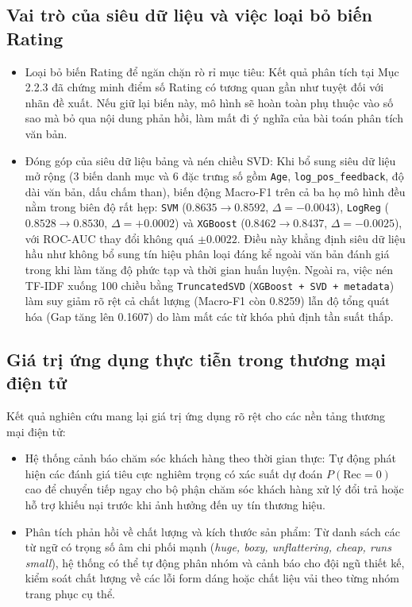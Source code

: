 \subsection{Vai trò của siêu dữ liệu và việc loại bỏ biến Rating}
\begin{itemize}
    \item Loại bỏ biến Rating để ngăn chặn rò rỉ mục tiêu: Kết quả phân tích tại Mục 2.2.3 đã chứng minh điểm số Rating có tương quan gần như tuyệt đối với nhãn đề xuất. Nếu giữ lại biến này, mô hình sẽ hoàn toàn phụ thuộc vào số sao mà bỏ qua nội dung phản hồi, làm mất đi ý nghĩa của bài toán phân tích văn bản.
    \item Đóng góp của siêu dữ liệu bảng và nén chiều SVD: Khi bổ sung siêu dữ liệu mở rộng (3 biến danh mục và 6 đặc trưng số gồm \texttt{Age}, \texttt{log\_pos\_feedback}, độ dài văn bản, dấu chấm than), biến động Macro-F1 trên cả ba họ mô hình đều nằm trong biên độ rất hẹp: \texttt{SVM} ($0.8635 \to 0.8592$, $\Delta = -0.0043$), \texttt{LogReg} ($0.8528 \to 0.8530$, $\Delta = +0.0002$) và \texttt{XGBoost} ($0.8462 \to 0.8437$, $\Delta = -0.0025$), với ROC-AUC thay đổi không quá $\pm 0.0022$. Điều này khẳng định siêu dữ liệu hầu như không bổ sung tín hiệu phân loại đáng kể ngoài văn bản đánh giá trong khi làm tăng độ phức tạp và thời gian huấn luyện. Ngoài ra, việc nén TF-IDF xuống 100 chiều bằng \texttt{TruncatedSVD} (\texttt{XGBoost + SVD + metadata}) làm suy giảm rõ rệt cả chất lượng (Macro-F1 còn 0.8259) lẫn độ tổng quát hóa (Gap tăng lên 0.1607) do làm mất các từ khóa phủ định tần suất thấp.
\end{itemize}

\subsection{Giá trị ứng dụng thực tiễn trong thương mại điện tử}
Kết quả nghiên cứu mang lại giá trị ứng dụng rõ rệt cho các nền tảng thương mại điện tử:
\begin{itemize}
    \item Hệ thống cảnh báo chăm sóc khách hàng theo thời gian thực: Tự động phát hiện các đánh giá tiêu cực nghiêm trọng có xác suất dự đoán $P(\text{Rec}=0)$ cao để chuyển tiếp ngay cho bộ phận chăm sóc khách hàng xử lý đổi trả hoặc hỗ trợ khiếu nại trước khi ảnh hưởng đến uy tín thương hiệu.
    \item Phân tích phản hồi về chất lượng và kích thước sản phẩm: Từ danh sách các từ ngữ có trọng số âm chi phối mạnh (\textit{huge, boxy, unflattering, cheap, runs small}), hệ thống có thể tự động phân nhóm và cảnh báo cho đội ngũ thiết kế, kiểm soát chất lượng về các lỗi form dáng hoặc chất liệu vải theo từng nhóm trang phục cụ thể.
\end{itemize}

